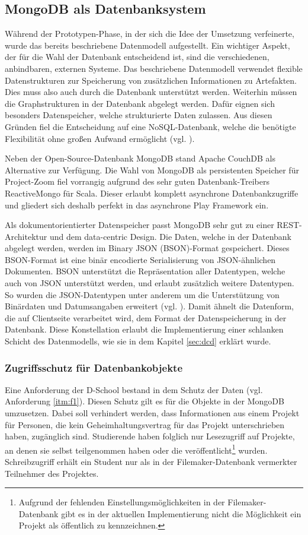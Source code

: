 \subsection{MongoDB als Datenbanksystem}
Während der Prototypen-Phase, in der sich die Idee der Umsetzung verfeinerte, wurde das bereits beschriebene Datenmodell aufgestellt. Ein wichtiger Aspekt, der für die Wahl der Datenbank entscheidend ist, sind die verschiedenen, anbindbaren, externen Systeme. Das beschriebene Datenmodell verwendet flexible Datenstrukturen zur Speicherung von zusätzlichen Informationen zu Artefakten. Dies muss also auch durch die Datenbank unterstützt werden. Weiterhin müssen die Graphstrukturen in der Datenbank abgelegt werden. Dafür eignen sich besonders Datenspeicher, welche strukturierte Daten zulassen. Aus diesen Gründen fiel die Entscheidung auf eine NoSQL-Datenbank, welche die benötigte Flexibilität ohne großen Aufwand ermöglicht (vgl. \cite{mysgl-to-nosql}).

Neben der Open-Source-Datenbank MongoDB stand Apache CouchDB als Alternative zur Verfügung. Die Wahl von MongoDB als persistenten Speicher für Project-Zoom fiel vorrangig aufgrund des sehr guten Datenbank-Treibers ReactiveMongo für Scala. Dieser erlaubt komplett asynchrone Datenbankzugriffe und gliedert sich deshalb perfekt in das asynchrone Play Framework ein.

Als dokumentorientierter Datenspeicher passt MongoDB sehr gut zu einer REST-Architektur und dem data-centric Design. Die Daten, welche in der Datenbank abgelegt werden, werden im Binary JSON (BSON)-Format gespeichert. Dieses BSON-Format ist eine binär encodierte Serialisierung von JSON-ähnlichen Dokumenten. BSON unterstützt die Repräsentation aller Datentypen, welche auch von JSON unterstützt werden, und erlaubt zusätzlich weitere Datentypen. So wurden die JSON-Datentypen unter anderem um die Unterstützung von Binärdaten und Datumsangaben erweitert (vgl. \cite{bson}). Damit ähnelt die Datenform, die auf Clientseite verarbeitet wird, dem Format der Datenspeicherung in der Datenbank. Diese Konstellation erlaubt die Implementierung einer schlanken Schicht des Datenmodells, wie sie in dem Kapitel \ref{sec:dcd} erklärt wurde.

\subsubsection{Zugriffsschutz für Datenbankobjekte}

Eine Anforderung der D-School bestand in dem Schutz der Daten (vgl. Anforderung \ref{itm:f1}). Diesen Schutz gilt es für die Objekte in der MongoDB umzusetzen. Dabei soll verhindert werden, dass Informationen aus einem Projekt für Personen, die kein Geheimhaltungsvertrag für das Projekt unterschrieben haben, zugänglich sind. Studierende haben folglich nur Lesezugriff auf Projekte, an denen sie selbst teilgenommen haben oder die veröffentlicht\footnote{Aufgrund der fehlenden Einstellungsmöglichkeiten in der Filemaker-Datenbank gibt es in der aktuellen Implementierung nicht die Möglichkeit ein Projekt als öffentlich zu kennzeichnen.} wurden. Schreibzugriff erhält ein Student nur als in der Filemaker-Datenbank vermerkter Teilnehmer des Projektes.

